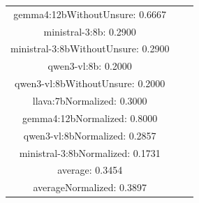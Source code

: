 \documentclass[a4paper]{article}
\begin{document}
\begin{tabular}{ccc}
gemma4:12bWithoutUnsure: 0.6667 \\ ministral-3:8b: 0.2900 \\ ministral-3:8bWithoutUnsure: 0.2900 \\ qwen3-vl:8b: 0.2000 \\ qwen3-vl:8bWithoutUnsure: 0.2000 \\ llava:7bNormalized: 0.3000 \\ gemma4:12bNormalized: 0.8000 \\ qwen3-vl:8bNormalized: 0.2857 \\ ministral-3:8bNormalized: 0.1731 \\ average: 0.3454 \\ averageNormalized: 0.3897 \end{minipage}\\
\end{tabular}

\vspace{5mm}
\end{document}
